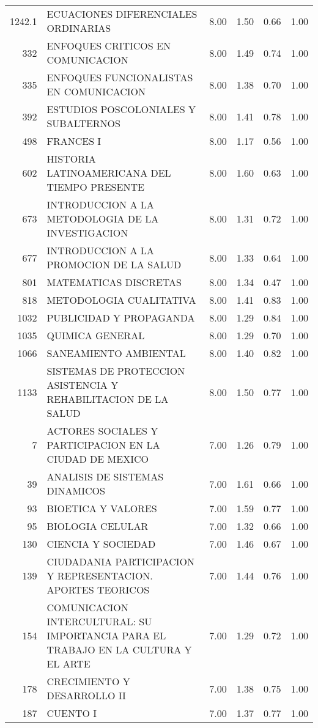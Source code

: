 \documentclass[12pt]{article}
\begin{document}
\begin{table}[ht]
\begin{tabular}{rlrrrr}
  1242.1 & ECUACIONES DIFERENCIALES ORDINARIAS & 8.00 & 1.50 & 0.66 & 1.00 \\ 
  332 & ENFOQUES CRITICOS EN COMUNICACION & 8.00 & 1.49 & 0.74 & 1.00 \\ 
  335 & ENFOQUES FUNCIONALISTAS EN COMUNICACION & 8.00 & 1.38 & 0.70 & 1.00 \\ 
  392 & ESTUDIOS POSCOLONIALES Y SUBALTERNOS & 8.00 & 1.41 & 0.78 & 1.00 \\ 
  498 & FRANCES I & 8.00 & 1.17 & 0.56 & 1.00 \\ 
  602 & HISTORIA LATINOAMERICANA DEL TIEMPO PRESENTE & 8.00 & 1.60 & 0.63 & 1.00 \\ 
  673 & INTRODUCCION A LA METODOLOGIA DE LA INVESTIGACION & 8.00 & 1.31 & 0.72 & 1.00 \\ 
  677 & INTRODUCCION A LA PROMOCION DE LA SALUD & 8.00 & 1.33 & 0.64 & 1.00 \\ 
  801 & MATEMATICAS DISCRETAS & 8.00 & 1.34 & 0.47 & 1.00 \\ 
  818 & METODOLOGIA CUALITATIVA & 8.00 & 1.41 & 0.83 & 1.00 \\ 
  1032 & PUBLICIDAD Y PROPAGANDA & 8.00 & 1.29 & 0.84 & 1.00 \\ 
  1035 & QUIMICA GENERAL & 8.00 & 1.29 & 0.70 & 1.00 \\ 
  1066 & SANEAMIENTO AMBIENTAL & 8.00 & 1.40 & 0.82 & 1.00 \\ 
  1133 & SISTEMAS DE PROTECCION ASISTENCIA Y REHABILITACION DE LA SALUD & 8.00 & 1.50 & 0.77 & 1.00 \\ 
  7 & ACTORES SOCIALES Y PARTICIPACION EN LA CIUDAD DE MEXICO & 7.00 & 1.26 & 0.79 & 1.00 \\ 
  39 & ANALISIS DE SISTEMAS DINAMICOS & 7.00 & 1.61 & 0.66 & 1.00 \\ 
  93 & BIOETICA Y VALORES & 7.00 & 1.59 & 0.77 & 1.00 \\ 
  95 & BIOLOGIA CELULAR & 7.00 & 1.32 & 0.66 & 1.00 \\ 
  130 & CIENCIA Y SOCIEDAD & 7.00 & 1.46 & 0.67 & 1.00 \\ 
  139 & CIUDADANIA PARTICIPACION Y REPRESENTACION. APORTES TEORICOS & 7.00 & 1.44 & 0.76 & 1.00 \\ 
  154 & COMUNICACION INTERCULTURAL: SU IMPORTANCIA PARA EL TRABAJO EN LA CULTURA Y EL ARTE & 7.00 & 1.29 & 0.72 & 1.00 \\ 
  178 & CRECIMIENTO Y DESARROLLO II & 7.00 & 1.38 & 0.75 & 1.00 \\ 
  187 & CUENTO I & 7.00 & 1.37 & 0.77 & 1.00 \\ 

\end{tabular}
\end{table}
\end{document}
